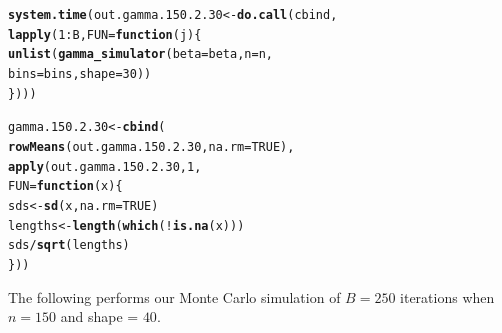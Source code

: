 \documentclass[11pt]{article}\usepackage[]{graphicx}\usepackage[]{color}
\makeatletter
\newcommand{\hlnum}[1]{\textcolor[rgb]{0.686,0.059,0.569}{#1}}%
\newcommand{\hlopt}[1]{\textcolor[rgb]{0,0,0}{#1}}%
\newcommand{\hlstd}[1]{\textcolor[rgb]{0.345,0.345,0.345}{#1}}%
\newcommand{\hlkwa}[1]{\textcolor[rgb]{0.161,0.373,0.58}{\textbf{#1}}}%
\newcommand{\hlkwb}[1]{\textcolor[rgb]{0.69,0.353,0.396}{#1}}%
\newcommand{\hlkwc}[1]{\textcolor[rgb]{0.333,0.667,0.333}{#1}}%
\newcommand{\hlkwd}[1]{\textcolor[rgb]{0.737,0.353,0.396}{\textbf{#1}}}%
\newenvironment{kframe}{%
 \def\at@end@of@kframe{}%
 \ifinner\ifhmode%
  \def\at@end@of@kframe{\end{minipage}}%
  \begin{minipage}{\columnwidth}%
 \fi\fi%
 \def\FrameCommand##1{\hskip\@totalleftmargin \hskip-\fboxsep
 \colorbox{shadecolor}{##1}\hskip-\fboxsep
     \hskip-\linewidth \hskip-\@totalleftmargin \hskip\columnwidth}%
 \MakeFramed {\advance\hsize-\width
   \@totalleftmargin\z@ \linewidth\hsize
   \@setminipage}}%
 {\par\unskip\endMakeFramed%
 \at@end@of@kframe}
\newenvironment{knitrout}{}{} %
\makeatother
\begin{document}
\begin{knitrout}
\color{fgcolor}\begin{kframe}
\begin{alltt}
\hlkwd{system.time}\hlstd{(out.gamma.150.2.30} \hlkwb{<-} \hlkwd{do.call}\hlstd{(cbind,}
  \hlkwd{lapply}\hlstd{(}\hlnum{1}\hlopt{:}\hlstd{B,} \hlkwc{FUN} \hlstd{=} \hlkwa{function}\hlstd{(}\hlkwc{j}\hlstd{)\{}
    \hlkwd{unlist}\hlstd{(}\hlkwd{gamma_simulator}\hlstd{(}\hlkwc{beta} \hlstd{= beta,} \hlkwc{n} \hlstd{= n,}
      \hlkwc{bins} \hlstd{= bins,} \hlkwc{shape} \hlstd{=} \hlnum{30}\hlstd{))}
\hlstd{\})))}
\end{alltt}


{\ttfamily\noindent\bfseries\color{errorcolor}{\#\# Error in eval(family\$initialize): non-positive values not allowed for the 'gamma' family}}

{\ttfamily\noindent\itshape\color{messagecolor}{\#\# Timing stopped at: 0.003 0 0.003}}\end{kframe}
\end{knitrout}

\begin{knitrout}
\color{fgcolor}\begin{kframe}
\begin{alltt}
\hlstd{gamma.150.2.30} \hlkwb{<-} \hlkwd{cbind}\hlstd{(}
  \hlkwd{rowMeans}\hlstd{(out.gamma.150.2.30,} \hlkwc{na.rm} \hlstd{=} \hlnum{TRUE}\hlstd{),}
  \hlkwd{apply}\hlstd{(out.gamma.150.2.30,} \hlnum{1}\hlstd{,}
  \hlkwc{FUN} \hlstd{=} \hlkwa{function}\hlstd{(}\hlkwc{x}\hlstd{)\{}
    \hlstd{sds} \hlkwb{<-} \hlkwd{sd}\hlstd{(x,} \hlkwc{na.rm} \hlstd{=} \hlnum{TRUE}\hlstd{)}
    \hlstd{lengths} \hlkwb{<-} \hlkwd{length}\hlstd{(}\hlkwd{which}\hlstd{(}\hlopt{!}\hlkwd{is.na}\hlstd{(x)))}
    \hlstd{sds} \hlopt{/} \hlkwd{sqrt}\hlstd{(lengths)}
  \hlstd{\}))}
\end{alltt}


{\ttfamily\noindent\bfseries\color{errorcolor}{\#\# Error in is.data.frame(x): object 'out.gamma.150.2.30' not found}}\end{kframe}
\end{knitrout}

The following performs our Monte Carlo simulation of $B = 250$ iterations 
when $n = 150$ and shape = $40$.
\end{document}
